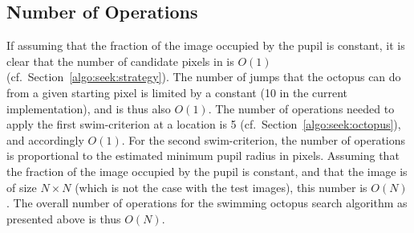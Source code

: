 
\subsection{Number of Operations}
\label{algo:seek:O}

If assuming that the fraction of the image occupied by the pupil is
constant, it is clear that the number of candidate pixels in {\SS} is
$O(1)$ (cf.\ Section~\ref{algo:seek:strategy}).  The number of jumps
that the octopus can do from a given starting pixel is limited by a
constant (10 in the current implementation), and is thus also $O(1)$.
The number of operations needed to apply the first swim-criterion at a
location is 5 (cf.\ Section~\ref{algo:seek:octopus}), and accordingly
$O(1)$.  For the second swim-criterion, the number of operations is
proportional to the estimated minimum pupil radius in pixels.
Assuming that the fraction of the image occupied by the pupil is
constant, and that the image is of size $N\times N$ (which is not the
case with the test images), this number is $O(N)$.  The overall number
of operations for the swimming octopus search algorithm as presented
above is thus $O(N)$.
